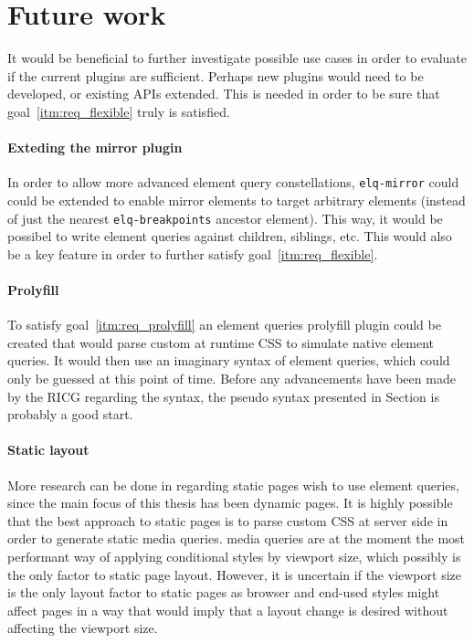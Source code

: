 \documentclass[a4paper,11pt]{kth-mag}
\newcommand{\code}[1]{\texttt{#1}}
\begin{document}
    \section{Future work}
      It would be beneficial to further investigate possible use cases in order to evaluate if the current plugins are sufficient.
      Perhaps new plugins would need to be developed, or existing \glspl{API} extended.
      This is needed in order to be sure that goal~\ref{itm:req_flexible} truly is satisfied.

      \paragraph{Exteding the mirror plugin}
      In order to allow more advanced element query constellations, \code{elq-mirror} could could be extended to enable mirror \glspl{element} to target arbitrary \glspl{element} (instead of just the nearest \code{elq-breakpoints} ancestor \gls{element}).
      This way, it would be possibel to write element queries against children, siblings, etc.
      This would also be a key feature in order to further satisfy goal~\ref{itm:req_flexible}.

      \paragraph{Prolyfill}
      To satisfy goal~\ref{itm:req_prolyfill} an element queries prolyfill plugin could be created that would parse custom at runtime \gls{CSS} to simulate \gls{native} element queries.
      It would then use an imaginary syntax of element queries, which could only be guessed at this point of time.
      Before any advancements have been made by the RICG regarding the syntax, the pseudo syntax presented in Section is probably a good start.

      \paragraph{Static layout}
      More research can be done in regarding static pages wish to use element queries, since the main focus of this thesis has been dynamic pages.
      It is highly possible that the best approach to static pages is to parse custom \gls{CSS} at server side in order to generate static \gls{media queries}.
      \Gls{media queries} are at the moment the most performant way of applying conditional styles by \gls{viewport} size, which possibly is the only factor to static page layout.
      However, it is uncertain if the \gls{viewport} size is the only layout factor to static pages as \gls{browser} and end-used styles might affect pages in a way that would imply that a layout change is desired without affecting the \gls{viewport} size.
\end{document}
